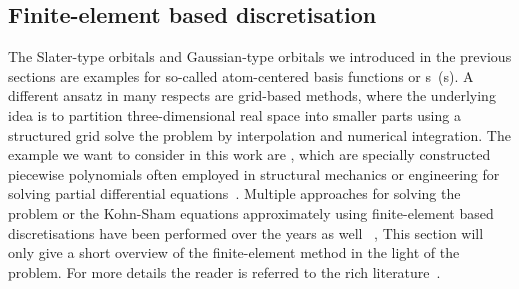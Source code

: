 \subsection{Finite-element based discretisation}
\label{sec:FE}
\newcommand{\Nquadc}{\ensuremath N_\text{quadc}}
\newcommand{\Ncell}{\ensuremath N_\text{cell}}

The Slater-type orbitals and Gaussian-type orbitals
we introduced in the previous sections
are examples for so-called atom-centered basis functions
or s~({\ACO}s).
A different ansatz in many respects
are grid-based methods,
where the underlying idea is to partition three-dimensional real space
into smaller parts using a structured grid
solve the problem by interpolation and numerical integration.
The example we want to consider in this work are ,
which are specially constructed piecewise polynomials
often employed in structural mechanics or engineering
for solving partial differential equations~\cite{Johnson1987}.
Multiple approaches for
solving the \HF problem or the Kohn-Sham equations approximately
using finite-element based discretisations
have been performed over the years as well%
~\cite{Tsuchida1995,Soler2002,Lehtovaara2009,Alizadegan2010,Avery2011PhD,Davydov2015,Lee2015,Boffi2016},
This section will only give a short overview of the finite-element method
in the light of the \HF problem.
For more details the reader is referred
to the rich literature~\cite{Johnson1987,Grossmann1992,Bangerth2003,Brenner2008}.


